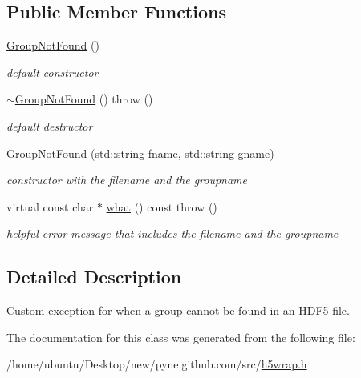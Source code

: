 \subsection*{Public Member Functions}
\begin{DoxyCompactItemize}
\item 
\hyperlink{classh5wrap_1_1_group_not_found_accc7d7bea9e86968335a46ee39d7d543}{Group\+Not\+Found} ()\hypertarget{classh5wrap_1_1_group_not_found_accc7d7bea9e86968335a46ee39d7d543}{}\label{classh5wrap_1_1_group_not_found_accc7d7bea9e86968335a46ee39d7d543}

\begin{DoxyCompactList}\small\item\em default constructor \end{DoxyCompactList}\item 
\hyperlink{classh5wrap_1_1_group_not_found_a79dea7d1d5e3ffd7a7e83b4a2636398a}{$\sim$\+Group\+Not\+Found} ()  throw ()\hypertarget{classh5wrap_1_1_group_not_found_a79dea7d1d5e3ffd7a7e83b4a2636398a}{}\label{classh5wrap_1_1_group_not_found_a79dea7d1d5e3ffd7a7e83b4a2636398a}

\begin{DoxyCompactList}\small\item\em default destructor \end{DoxyCompactList}\item 
\hyperlink{classh5wrap_1_1_group_not_found_a74f7e8f6efcf33503f5fec62eead40c3}{Group\+Not\+Found} (std\+::string fname, std\+::string gname)\hypertarget{classh5wrap_1_1_group_not_found_a74f7e8f6efcf33503f5fec62eead40c3}{}\label{classh5wrap_1_1_group_not_found_a74f7e8f6efcf33503f5fec62eead40c3}

\begin{DoxyCompactList}\small\item\em constructor with the filename and the groupname \end{DoxyCompactList}\item 
virtual const char $\ast$ \hyperlink{classh5wrap_1_1_group_not_found_a76766dc5fda0a07564379db454df87d0}{what} () const   throw ()\hypertarget{classh5wrap_1_1_group_not_found_a76766dc5fda0a07564379db454df87d0}{}\label{classh5wrap_1_1_group_not_found_a76766dc5fda0a07564379db454df87d0}

\begin{DoxyCompactList}\small\item\em helpful error message that includes the filename and the groupname \end{DoxyCompactList}\end{DoxyCompactItemize}


\subsection{Detailed Description}
Custom exception for when a group cannot be found in an H\+D\+F5 file. 

The documentation for this class was generated from the following file\+:\begin{DoxyCompactItemize}
\item 
/home/ubuntu/\+Desktop/new/pyne.\+github.\+com/src/\hyperlink{h5wrap_8h}{h5wrap.\+h}\end{DoxyCompactItemize}
